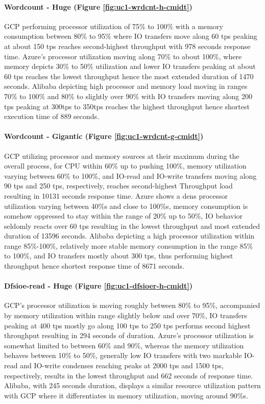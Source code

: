 \documentclass[review]{elsarticle}
\begin{document}
\paragraph{Wordcount - Huge (Figure \ref{fig:uc1-wrdcnt-h-cmidt})}GCP performing processor utilization of 75\% to 100\% with a memory consumption between 80\% to 95\% where IO transfers move along 60 tps peaking at about 150 tps reaches second-highest throughput with 978 seconds response time. Azure's processor utilization moving along 70\% to about 100\%, where memory depicts 30\% to 50\% utilization and lower IO transfers peaking at about 60 tps reaches the lowest throughput hence the most extended duration of 1470 seconds. Alibaba depicting high processor and memory load moving in ranges 70\% to 100\% and 80\% to slightly over 90\% with IO transfers moving along 200 tps peaking at 300tps to 350tps reaches the highest throughput hence shortest execution time of 889 seconds.

\paragraph{Wordcount - Gigantic (Figure \ref{fig:uc1-wrdcnt-g-cmidt})}GCP utilizing processor and memory sources at their maximum during the overall process, for CPU within 60\% up to pushing 100\%, memory utilization varying between 60\% to 100\%, and IO-read and IO-write transfers moving along 90 tps and 250 tps, respectively, reaches second-highest Throughput load resulting in 10131 seconds response time. Azure shows a dens processor utilization varying between 40\%s and close to 100\%s, memory consumption is somehow oppressed to stay within the range of 20\% up to 50\%, IO behavior seldomly reacts over 60 tps resulting in the lowest throughput and most extended duration of 13596 seconds. Alibaba depicting a high processor utilization within range 85\%-100\%, relatively more stable memory consumption in the range 85\% to 100\%, and IO transfers mostly about 300 tps, thus performing highest throughput hence shortest response time of 8671 seconds.

\paragraph{Dfsioe-read - Huge (Figure \ref{fig:uc1-dfsioer-h-cmidt})}GCP's processor utilization is moving roughly between 80\% to 95\%, accompanied by memory utilization within range slightly below and over 70\%, IO transfers peaking at 400 tps mostly go along 100 tps to 250 tps performs second highest throughput resulting in 294 seconds of duration. Azure's processor utilization is somewhat limited to between 60\% and 90\%, whereas the memory utilization behaves between 10\% to 50\%, generally low IO transfers with two markable IO-read and IO-write condenses reaching peaks at 2000 tps and 1500 tps, respectively, results in the lowest throughput and 662 seconds of response time. Alibaba, with 245 seconds duration, displays a similar resource utilization pattern with GCP where it differentiates in memory utilization, moving around 90\%s.
\end{document}
